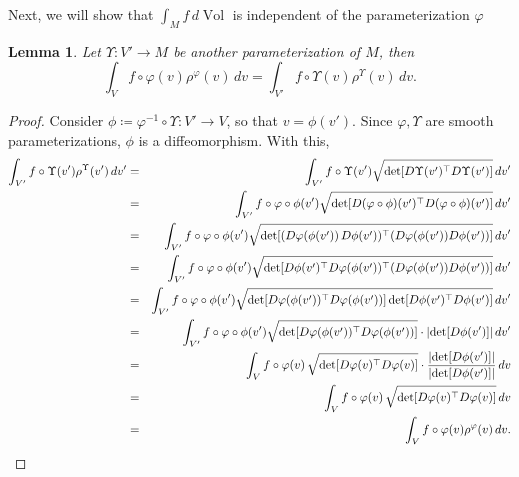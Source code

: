 \documentclass{article}
\renewcommand\det{\operatorname{det}}
\newcommand{\f}[2]{\frac{#1}{#2}}
\theoremstyle{theorem}
\newtheorem{lemma}[theorem]{Lemma}
\newcommand{\Vol}{\operatorname{Vol}}
\begin{document}
Next, we will show that $\int_M f\,d\Vol$ is independent of the parameterization $\varphi$

\begin{lemma}
Let $\Upsilon: V' \to M$ be another parameterization of $M$, then 
\begin{equation*}
    \int_{V} f\circ \varphi(v) \rho^\varphi(v)\,dv = \int_{V'} f\circ \Upsilon(v) \rho^{\Upsilon}(v)\,dv.
\end{equation*}
\end{lemma}


\begin{proof}
Consider $\phi \coloneqq \varphi^{-1}\circ \Upsilon : V'\to V$, so that $v = \phi(v')$. Since $\varphi, \Upsilon$ are smooth parameterizations, $\phi$ is a diffeomorphism. With this, 
\begin{eqnarray*}
    \int_{V'}f\circ \Upsilon(v') \rho^{\Upsilon}(v')\,dv' 
    &=& \int_{V'}f\circ \Upsilon(v') \sqrt{\det [ D \Upsilon (v') ^\top D \Upsilon(v') ]}\,dv' \\
    &=& \int_{V'}f\circ \varphi \circ \phi (v') \sqrt{\det [ D (\varphi \circ \phi) (v')^\top D (\varphi \circ \phi) (v') ]}\,dv' \\
    &=& \int_{V'}f\circ \varphi \circ \phi (v') \sqrt{\det[ (D\varphi(\phi(v'))\,D \phi (v'))^\top  (D\varphi(\phi(v'))D \phi (v')) ] }\,dv' \\
    &=& \int_{V'}f\circ \varphi \circ \phi (v') \sqrt{\det[ D\phi(v')^\top D\varphi(\phi(v'))^\top (D\varphi(\phi(v')) D \phi (v'))  ]}\,dv' \\
    &=& \int_{V'}f\circ \varphi \circ \phi (v') \sqrt{\det[  D\varphi(\phi(v'))^\top D\varphi(\phi(v'))  ]\det[D \phi(v')^\top D \phi(v')]}\,dv' \\
    &=& \int_{V'}f\circ \varphi \circ \phi (v') \sqrt{\det[  D\varphi(\phi(v'))^\top D\varphi(\phi(v'))  ]}\cdot   \abs{\det[D\phi(v')]}\,dv' \\
    &=& \int_V f\circ \varphi(v)\,\sqrt{\det[D \varphi(v)^\top D \varphi(v)]} \cdot \f{\abs{\det[D\phi(v')]}}{\abs{\det[D\phi(v')]}} \,dv \\ 
    &=& \int_V f\circ \varphi(v)\,\sqrt{\det[D \varphi(v)^\top D \varphi(v)]} \,dv\\
    &=& \int_{V} f\circ \varphi(v) \rho^\varphi(v)\,dv.
\end{eqnarray*}
\end{proof}




\end{document}
